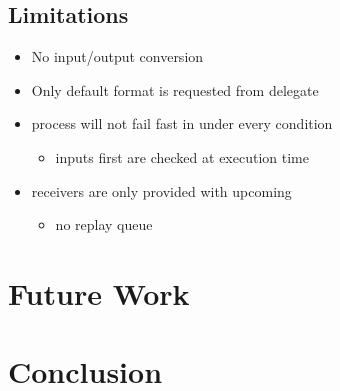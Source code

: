 	\subsection{Limitations}
	\begin{itemize}
		\item No input/output conversion
		\item Only default format is requested from delegate
		\item process will not fail fast in under every condition
		\begin{itemize}
			\item inputs first are checked at execution time
		\end{itemize}
		\item receivers are only provided with upcoming
		\begin{itemize}
			\item no replay queue
		\end{itemize}
	\end{itemize}
\section{Future Work}
\section{Conclusion}